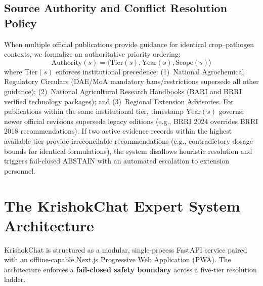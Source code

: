 \documentclass[11pt,a4paper]{article}
\begin{document}
\subsection{Source Authority and Conflict Resolution Policy}
When multiple official publications provide guidance for identical crop--pathogen contexts, we formalize an authoritative priority ordering:
\begin{equation}
\label{eq:source_authority}
\text{Authority}(s) = \langle \text{Tier}(s), \text{Year}(s), \text{Scope}(s) \rangle
\end{equation}
where $\text{Tier}(s)$ enforces institutional precedence:
(1)~National Agrochemical Regulatory Circulars (DAE/MoA mandatory bans/restrictions supersede all other guidance);
(2)~National Agricultural Research Handbooks (BARI and BRRI verified technology packages); and
(3)~Regional Extension Advisories.
For publications within the same institutional tier, timestamp $\text{Year}(s)$ governs: newer official revisions supersede legacy editions (e.g., BRRI 2024 overrides BRRI 2018 recommendations). If two active evidence records within the highest available tier provide irreconcilable recommendations (e.g., contradictory dosage bounds for identical formulations), the system disallows heuristic resolution and triggers fail-closed $\text{ABSTAIN}$ with an automated escalation to extension personnel.

\section{The KrishokChat Expert System Architecture}
\label{sec:architecture}

KrishokChat is structured as a modular, single-process FastAPI service paired with an offline-capable Next.js Progressive Web Application (PWA). The architecture enforces a \textbf{fail-closed safety boundary} across a five-tier resolution ladder.
\end{document}
